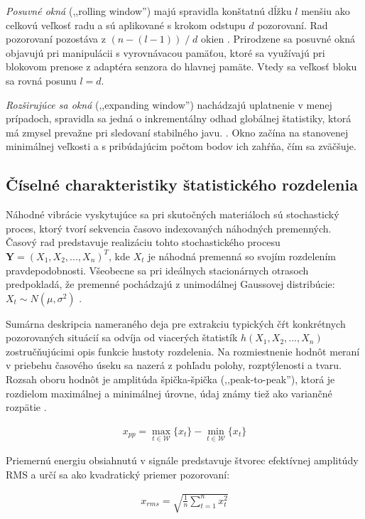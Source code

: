 \emph{Posuvné okná} (,,rolling window'') majú spravidla konštatnú dĺžku $l$
menšiu ako celkovú veľkosť radu a sú aplikované s krokom odstupu $d$ pozorovaní. Rad pozorovaní pozostáva z $ (n - (l  - 1))\;/\;d$
okien \cite{online-anomaly-detection}. Prirodzene sa posuvné okná objavujú pri manipulácii s vyrovnávacou pamäťou, ktoré sa využívajú
pri blokovom prenose z adaptéra senzora do hlavnej pamäte. Vtedy sa veľkosť bloku sa rovná posunu $l = d$.

\emph{Rozširujúce sa okná} (,,expanding window'') nachádzajú uplatnenie v menej prípadoch, spravidla sa jedná o inkrementálny
odhad globálnej štatistiky, ktorá má zmysel prevažne pri sledovaní stabilného javu. \cite{practical-time-series}. Okno začína na
stanovenej minimálnej veľkosti a s pribúdajúcim počtom bodov ich zahŕňa, čím sa zväčšuje.

\subsection{Číselné charakteristiky štatistického rozdelenia}
Náhodné vibrácie vyskytujúce sa pri skutočných materiáloch sú stochastický proces, ktorý tvorí sekvencia časovo indexovaných
náhodných premenných. Časový rad predstavuje realizáciu tohto stochastického procesu $\mathbf{Y} = (X_1, X_2, ..., X_n)^T$, kde $X_t$
je náhodná premenná so svojím rozdelením pravdepodobnosti. Všeobecne sa pri ideálnych stacionárnych otrasoch predpokladá, že premenné
pochádzajú z unimodálnej Gaussovej distribúcie: $X_t \sim N(\mu, \sigma^2)$ \cite{vibrations-shock}.

Sumárna deskripcia nameraného deja pre extrakciu typických čŕt konkrétnych pozorovaných situácií sa odvíja od viacerých štatistík
$h(X_1, X_2, ..., X_n)$ zostručňujúcimi opis funkcie hustoty rozdelenia. Na rozmiestnenie hodnôt meraní v priebehu časového úseku
sa nazerá z pohľadu polohy, rozptýlenosti a tvaru. Rozsah oboru hodnôt je amplitúda špička-špička (,,peak-to-peak''),
ktorá je rozdielom maximálnej a minimálnej úrovne, údaj známy tiež ako variančné rozpätie \cite{zaklady-statistiky}.
\begin{ceqn}\begin{align}
x_{pp} = \max_{t \in \mathcal{W}}\{x_t\} - \min_{t \in \mathcal{W}}\{x_t\}
\end{align}\end{ceqn}

Priemernú energiu obsiahnutú v signále predstavuje štvorec efektívnej amplitúdy RMS a určí sa ako kvadratický priemer pozorovaní:
\begin{ceqn}\begin{align}
x_{rms} = \sqrt{\frac{1}{n}\sum_{t=1}^{n}{x_t^2}}
\end{align}\end{ceqn}

